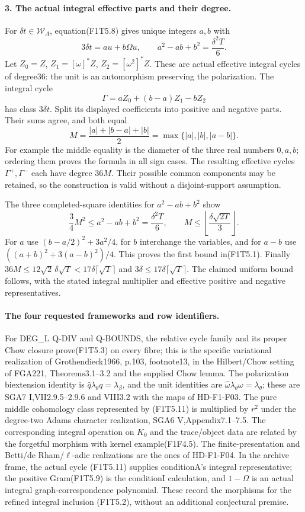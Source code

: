 \paragraph{3. The actual integral effective parts and their degree.}
For $\delta t\in\mathscr W_A$, equation(F1T5.8) gives unique
integers $a,b$ with
\[
 3\delta t=a u+b\Omega u,
 \qquad a^2-ab+b^2=\frac{\delta^2T}{6}.
 \tag{F1T5.10}
\]
Let $Z_0=Z$, $Z_1=[\omega]^*Z$, $Z_2=[\omega^2]^*Z$.
These are actual effective integral cycles of degree36: the unit
is an automorphism preserving the polarization. The integral cycle
\[
 \Gamma=aZ_0+(b-a)Z_1-bZ_2
 \tag{F1T5.11}
\]
has class $3\delta t$. Split its displayed coefficients into
positive and negative parts. Their sums agree, and both equal
\[
 M=\frac{|a|+|b-a|+|b|}{2}
                =\max\{|a|,|b|,|a-b|\}.
 \tag{F1T5.12}
\]
For example the middle equality is the diameter of the three
real numbers $0,a,b$; ordering them proves the formula in all
sign cases. The resulting effective cycles $\Gamma^+,\Gamma^-$
each have degree $36M$. Their possible common components may be
retained, so the construction is valid without a disjoint-support
assumption.

The three completed-square identities for
$a^2-ab+b^2$ show
\[
 \frac34M^2\le a^2-ab+b^2=\frac{\delta^2T}{6},
 \qquad
 M\le\left\lfloor\frac{\delta\sqrt{2T}}3\right\rfloor.
 \tag{F1T5.13}
\]
For $a$ use $(b-a/2)^2+3a^2/4$, for $b$ interchange the
variables, and for $a-b$ use $((a+b)^2+3(a-b)^2)/4$.
This proves the first bound in(F1T5.1). Finally
$36M\le12\sqrt2\,\delta\sqrt T<17\delta\lceil\sqrt T\rceil$
and $3\delta\le17\delta\lceil\sqrt T\rceil$.
The claimed uniform bound follows, with the stated integral
multiplier and effective positive and negative representatives.

\paragraph{The four requested frameworks and row identifiers.}
For DEG\_L Q-DIV and Q-BOUNDS, the relative cycle family and its
proper Chow closure prove(F1T5.3) on every fibre; this is the
specific variational realization of Grothendieck1966, p.103,
footnote13, in the Hilbert/Chow setting of FGA221,
Theorems3.1--3.2 and the supplied Chow lemma. The polarization
biextension identity is $\widehat q\lambda_\theta q=\lambda_\beta$,
and the unit identities are
$\widehat\omega\lambda_\theta\omega=\lambda_\theta$;
these are SGA7 I,VII2.9.5--2.9.6 and VIII3.2 with the maps
of HD-F1-F03. The pure middle cohomology class represented by
(F1T5.11) is multiplied by $r^2$ under the degree-two Adams
character realization, SGA6 V,Appendix7.1--7.5. The corresponding
integral operation on $K_0$ and the trace/object data are
related by the forgetful morphism with kernel example(F1F4.5).
The finite-presentation and Betti/de Rham/$\ell$-adic realizations
are the ones of HD-F1-F04. In the archive frame, the actual cycle
(F1T5.11) supplies conditionA's integral representative; the
positive Gram(F1T5.9) is the conditionI calculation, and
$1-\Omega$ is an actual integral graph-correspondence polynomial.
These record the morphisms for the refined integral inclusion
(F1T5.2), without an additional conjectural premise.

